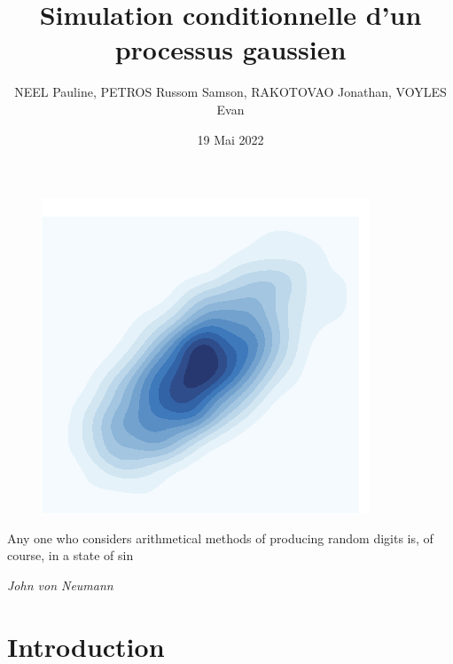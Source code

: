 \documentclass[10pt]{article} %
\title{Simulation conditionnelle d'un processus gaussien}
\author{NEEL Pauline, PETROS Russom Samson, RAKOTOVAO Jonathan, VOYLES Evan}
\date{19 Mai 2022}
\begin{document}
\begin{titlepage}

\maketitle

\begin{figure}[h!]
    \centering
    \includegraphics{media/plot.png}
\end{figure}

\vspace{3cm}





\epigraph{Any one who considers arithmetical methods of producing random digits is, of course, in a state of sin}
 {\textit{John von Neumann}}

\newpage

\end{titlepage}

\pagestyle{fancy}

\tableofcontents

\newpage

\section{Introduction}
\end{document}
